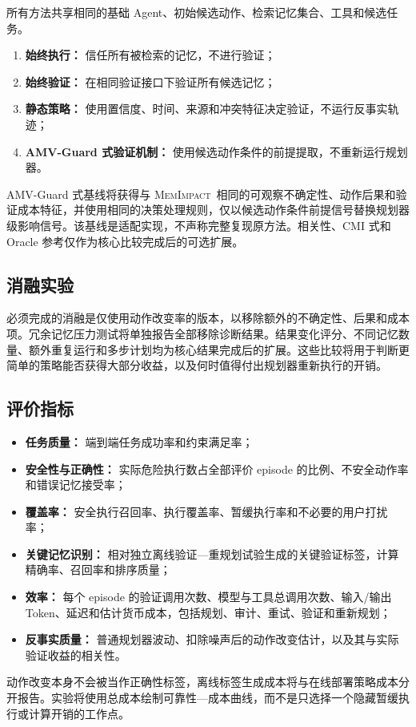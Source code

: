 \documentclass[11pt]{article}
\newcommand{\method}{\textsc{MemImpact}}
\begin{document}
所有方法共享相同的基础 Agent、初始候选动作、检索记忆集合、工具和候选任务。
\begin{enumerate}
  \item \textbf{始终执行：} 信任所有被检索的记忆，不进行验证；
  \item \textbf{始终验证：} 在相同验证接口下验证所有候选记忆；
  \item \textbf{静态策略：} 使用置信度、时间、来源和冲突特征决定验证，不运行反事实轨迹；
  \item \textbf{AMV-Guard 式验证机制：} 使用候选动作条件的前提提取，不重新运行规划器。
\end{enumerate}
AMV-Guard 式基线将获得与 \method\ 相同的可观察不确定性、动作后果和验证成本特征，并使用相同的决策处理规则，仅以候选动作条件前提信号替换规划器级影响信号。该基线是适配实现，不声称完整复现原方法。相关性、CMI 式和 Oracle 参考仅作为核心比较完成后的可选扩展。

\subsection{消融实验}

必须完成的消融是仅使用动作改变率的版本，以移除额外的不确定性、后果和成本项。冗余记忆压力测试将单独报告全部移除诊断结果。结果变化评分、不同记忆数量、额外重复运行和多步计划均为核心结果完成后的扩展。这些比较将用于判断更简单的策略能否获得大部分收益，以及何时值得付出规划器重新执行的开销。

\subsection{评价指标}

\begin{itemize}
  \item \textbf{任务质量：} 端到端任务成功率和约束满足率；
  \item \textbf{安全性与正确性：} 实际危险执行数占全部评价 episode 的比例、不安全动作率和错误记忆接受率；
  \item \textbf{覆盖率：} 安全执行召回率、执行覆盖率、暂缓执行率和不必要的用户打扰率；
  \item \textbf{关键记忆识别：} 相对独立离线验证—重规划试验生成的关键验证标签，计算精确率、召回率和排序质量；
  \item \textbf{效率：} 每个 episode 的验证调用次数、模型与工具总调用次数、输入/输出 Token、延迟和估计货币成本，包括规划、审计、重试、验证和重新规划；
  \item \textbf{反事实质量：} 普通规划器波动、扣除噪声后的动作改变估计，以及其与实际验证收益的相关性。
\end{itemize}
动作改变本身不会被当作正确性标签，离线标签生成成本将与在线部署策略成本分开报告。实验将使用总成本绘制可靠性—成本曲线，而不是只选择一个隐藏暂缓执行或计算开销的工作点。
\end{document}
